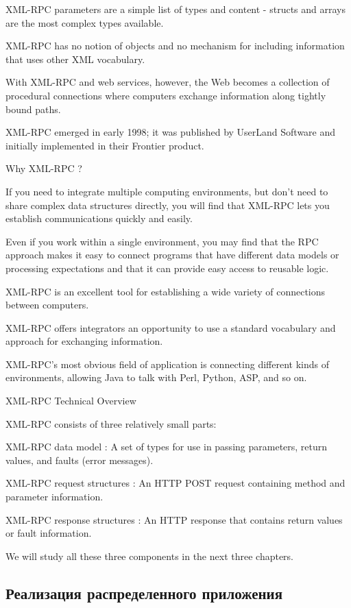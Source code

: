 \documentclass[a4paper,openany,twoside,final]{book}
\begin{document}
    XML-RPC parameters are a simple list of types and content - structs and arrays are the most complex types available.

    XML-RPC has no notion of objects and no mechanism for including information that uses other XML vocabulary.

    With XML-RPC and web services, however, the Web becomes a collection of procedural connections where computers exchange information along tightly bound paths.

    XML-RPC emerged in early 1998; it was published by UserLand Software and initially implemented in their Frontier product.

Why XML-RPC ?

If you need to integrate multiple computing environments, but don't need to share complex data structures directly, you will find that XML-RPC lets you establish communications quickly and easily.

Even if you work within a single environment, you may find that the RPC approach makes it easy to connect programs that have different data models or processing expectations and that it can provide easy access to reusable logic.

    XML-RPC is an excellent tool for establishing a wide variety of connections between computers.

    XML-RPC offers integrators an opportunity to use a standard vocabulary and approach for exchanging information.

    XML-RPC's most obvious field of application is connecting different kinds of environments, allowing Java to talk with Perl, Python, ASP, and so on.

XML-RPC Technical Overview

XML-RPC consists of three relatively small parts:

    XML-RPC data model : A set of types for use in passing parameters, return values, and faults (error messages).

    XML-RPC request structures : An HTTP POST request containing method and parameter information.

    XML-RPC response structures : An HTTP response that contains return values or fault information.

We will study all these three components in the next three chapters.

\newpage
\subsection{Реализация распределенного приложения}
\label{sec:distrimpl}
\end{document}
